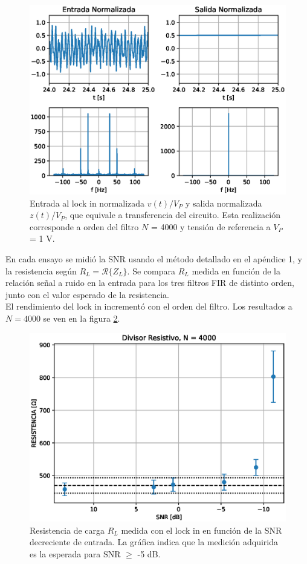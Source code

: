 \documentclass[11pt,a4paper]{extarticle}
\begin{document}
\begin{multicols}{2}
\begin{figure}[H]
	\centering
	\includegraphics[width=\linewidth]{Images/in_out.eps}
	\caption{Entrada al lock in normalizada $v(t)/V_P$ y salida normalizada $z(t)/V_P$, 
	que equivale a transferencia del circuito. Esta realización corresponde a orden del filtro $N$ = 4000 y tensión de referencia a $V_P$ = 1 V.}
	\label{fig:in_out}
\end{figure}

En cada ensayo se midió la SNR usando el método detallado en el apéndice 1, y la resistencia según $R_L = \mathcal{R}\{Z_L\}$.
Se compara $R_L$ medida en función de la relación señal a ruido en la entrada para los tres 
filtros FIR de distinto orden, junto con el valor esperado de la resistencia.\\

El rendimiento del lock in incrementó con el orden del filtro. Los resultados a $N = 4000$ se ven en la figura \ref{fig:RvsSNR}.

\begin{figure}[H]
	\centering
	\includegraphics[width=\linewidth]{Images/resistencia4000.eps}
	\caption{Resistencia de carga $R_L$ medida con 
	el lock in en función de la SNR decreciente de entrada. La gráfica indica que la medición adquirida es la esperada para SNR $\ge$ -5 dB.}
	\label{fig:RvsSNR}
\end{figure}


\end{multicols}
\end{document}
